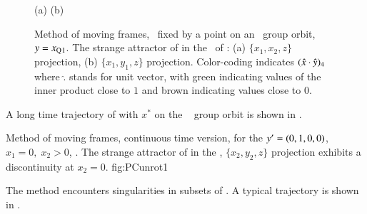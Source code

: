 

%
\begin{figure}[ht]
\begin{center}
(a) %
(b) %
\end{center}
\caption{
Method of moving frames, \slice\ fixed by a point on an
\reqv\ group orbit, $y = x_{\mathrm{Q}_{}1}$. The strange
attractor of  in the \reducedsp\
of :
(a) $\{x_1,x_2,z\}$ projection,
(b) $\{x_1,y_1,z\}$ projection.
Color-coding indicates $(\hat{x} \cdot \hat{y})_4$
where $\hat{.}$ stands for unit vector, with green indicating values
of the inner product close to $1$ and brown indicating values
close to $0$.
    }
\label{fig:CLEpcSect}
\end{figure}
%
A long time trajectory of  with
$x^*$ on the \reqv\  group orbit is shown in
.


{}{
Method of moving frames, continuous time version, for the
${y'}=(0,1,0,0)$,
$x_1=0,\;x_2>0$, \slice. The strange attractor of
 in the \reducedsp,
$\{x_2,y_2,z\}$ projection exhibits a discontinuity at
$x_2=0$.
}
{fig:PCunrot1}

The method encounters singularities in
subsets of \statesp{}.
A typical trajectory is shown in \reffig{fig:PCunrot1}.

